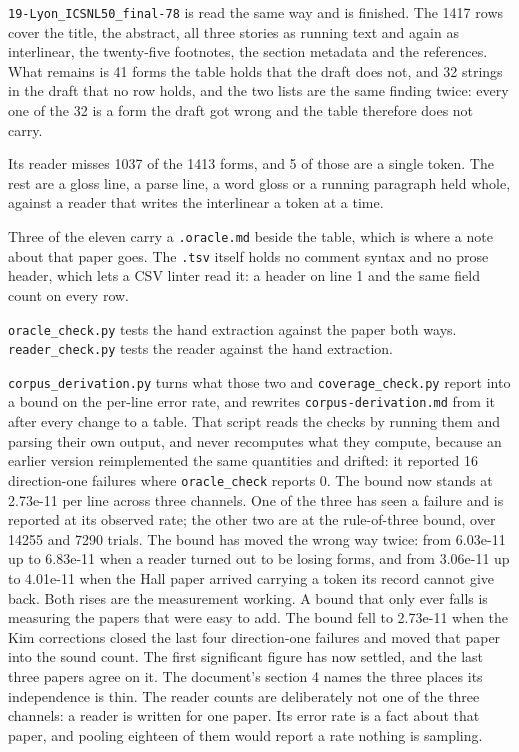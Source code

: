\texttt{19-\allowbreak{}Lyon\_\allowbreak{}ICSNL50\_\allowbreak{}final-\allowbreak{}78} is read the same way and is finished. The 1417 rows cover the title, the abstract, all three stories as running text and again as interlinear, the twenty-five footnotes, the section metadata and the references. What remains is 41 forms the table holds that the draft does not, and 32 strings in the draft that no row holds, and the two lists are the same finding twice: every one of the 32 is a form the draft got wrong and the table therefore does not carry.

Its reader misses 1037 of the 1413 forms, and 5 of those are a single token. The rest are a gloss line, a parse line, a word gloss or a running paragraph held whole, against a reader that writes the interlinear a token at a time.

Three of the eleven carry a \texttt{.\allowbreak{}oracle.\allowbreak{}md} beside the table, which is where a note about that paper goes. The \texttt{.\allowbreak{}tsv} itself holds no comment syntax and no prose header, which lets a CSV linter read it: a header on line 1 and the same field count on every row.

\texttt{oracle\_\allowbreak{}check.\allowbreak{}py} tests the hand extraction against the paper both ways. \texttt{reader\_\allowbreak{}check.\allowbreak{}py} tests the reader against the hand extraction.

\texttt{corpus\_\allowbreak{}derivation.\allowbreak{}py} turns what those two and \texttt{coverage\_\allowbreak{}check.\allowbreak{}py} report into a bound on the per-line error rate, and rewrites \texttt{corpus-\allowbreak{}derivation.\allowbreak{}md} from it after every change to a table. That script reads the checks by running them and parsing their own output, and never recomputes what they compute, because an earlier version reimplemented the same quantities and drifted: it reported 16 direction-one failures where \texttt{oracle\_\allowbreak{}check} reports 0. The bound now stands at 2.73e-11 per line across three channels. One of the three has seen a failure and is reported at its observed rate; the other two are at the rule-of-three bound, over 14255 and 7290 trials. The bound has moved the wrong way twice: from 6.03e-11 up to 6.83e-11 when a reader turned out to be losing forms, and from 3.06e-11 up to 4.01e-11 when the Hall paper arrived carrying a token its record cannot give back. Both rises are the measurement working. A bound that only ever falls is measuring the papers that were easy to add. The bound fell to 2.73e-11 when the Kim corrections closed the last four direction-one failures and moved that paper into the sound count. The first significant figure has now settled, and the last three papers agree on it. The document's section 4 names the three places its independence is thin. The reader counts are deliberately not one of the three channels: a reader is written for one paper. Its error rate is a fact about that paper, and pooling eighteen of them would report a rate nothing is sampling.

